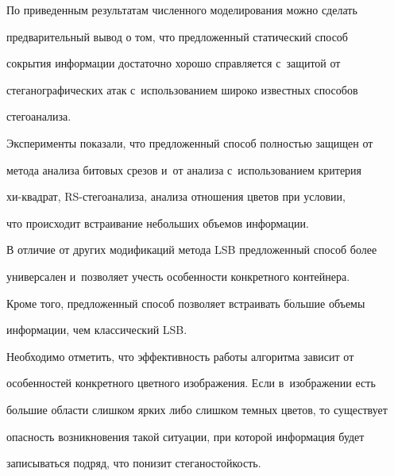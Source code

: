   


  По приведенным результатам численного моделирования можно сделать 


предварительный вывод о том, что предложенный статический способ 


сокрытия информации достаточно хорошо справляется с~защитой от 


стеганографических атак с~использованием широко известных способов 


стегоанализа. 


  


  Эксперименты показали, что предложенный способ полностью защищен от 


метода анализа битовых срезов и~от анализа с~использованием критерия  


хи-квад\-рат, RS-сте\-го\-ана\-ли\-за, анализа отношения цветов при условии, 


что происходит встраивание небольших объемов информации.


  


  В отличие от других модификаций метода LSB предложенный способ более 


универсален и~позволяет учесть особенности конкретного контейнера.




  Кроме того, предложенный способ позволяет встраивать б$\acute{\mbox{о}}$льшие объемы 


информации, чем классический LSB.


  


  Необходимо отметить, что эффективность работы алгоритма зависит от 


особенностей конкретного цветного изображения. Если в~изображении есть 


большие области слишком ярких либо слишком темных цветов, то существует 


опасность возникновения такой ситуации, при которой информация будет 


записываться подряд, что понизит стеганостойкость.


  


